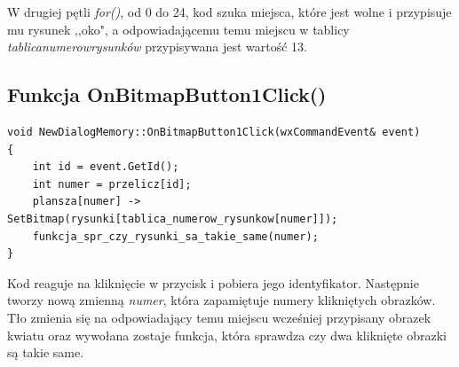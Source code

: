 \documentclass[a4paper]{article}
\begin{document}
W drugiej pętli \emph{for()}, od 0 do 24, kod szuka miejsca, które jest wolne i przypisuje mu rysunek ,,oko", a odpowiadającemu temu miejscu w tablicy \emph{tablica\textunderscore numerow\textunderscore rysunków} przypisywana jest wartość 13.


\subsection{Funkcja OnBitmapButton1Click()}
\begin{verbatim}
void NewDialogMemory::OnBitmapButton1Click(wxCommandEvent& event)
{
    int id = event.GetId();
    int numer = przelicz[id];
    plansza[numer] -> SetBitmap(rysunki[tablica_numerow_rysunkow[numer]]);
    funkcja_spr_czy_rysunki_sa_takie_same(numer);
}
\end{verbatim}
Kod reaguje na kliknięcie w przycisk i pobiera jego identyfikator. Następnie tworzy nową zmienną \emph{numer}, która zapamiętuje numery klikniętych obrazków. Tło zmienia się na odpowiadający temu miejscu wcześniej przypisany obrazek kwiatu oraz wywołana zostaje funkcja, która sprawdza czy dwa kliknięte obrazki są takie same.
\end{document}
